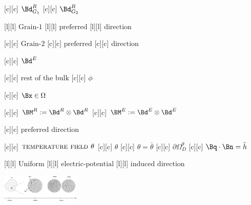 [c][c] {$\Bd^{R}_{G_1}$}
[c][c] {$\Bd^{R}_{G_2}$}

[l][l] {$\text{Grain-1}$}
[l][l] {$\text{preferred}$}
[l][l] {$\text{direction}$}

[c][c] {$\text{Grain-2}$}
[c][c] {$\text{preferred}$}
[c][c] {$\text{direction}$}

[c][c] {$\Bd^{E}$}

[c][c] {$\text{rest of the bulk}$}
[c][c] {$\phi$}

[c][c] {$\Bx \in \Omega$}

[c][c] {$\BM^{R} := \Bd^{R} \otimes \Bd^{R}$}
[c][c] {$\BM^{E} := \Bd^{E} \otimes \Bd^{E}$}

[c][c] {$\text{preferred direction}$}

[c][c] {$\textsc{temperature field } \theta$}
[c][c] {$\theta$}
[c][c] {$\theta = \bar{\theta}$}
[c][c] {$\partial\Omega^{\theta}_{D}$}
[c][c] {$\Bq\cdot\Bn = \bar{h}$}

[l][l] {$\text{Uniform}$}
[l][l] {$\text{electric-potential}$}
[l][l] {$\text{induced direction}$}

\includegraphics[width=0.28\textwidth]{dendrite_2parts_nosample_split.eps}
